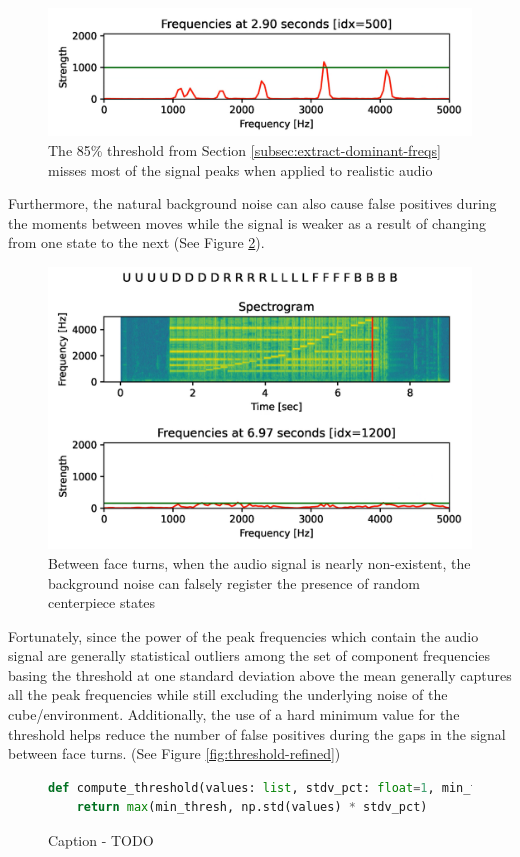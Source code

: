 \begin{figure}[h]
    \centering
    \includegraphics[width=0.8\linewidth]{Figures/5 Algorithm Design/threshold-miss.png}
    \caption{The 85\% threshold from Section \ref{subsec:extract-dominant-freqs} misses most of the signal peaks when applied to realistic audio}
    \label{fig:threshold-miss}
\end{figure}

Furthermore, the natural background noise can also cause false positives during the moments between moves while the signal is weaker as a result of changing from one state to the next (See Figure \ref{fig:threshold-false-positives}).

\begin{figure}[h]
    \centering
    \includegraphics[width=0.8\linewidth]{Figures/5 Algorithm Design/threshold-false-positives.png}
    \caption{Between face turns, when the audio signal is nearly non-existent, the background noise can falsely register the presence of random centerpiece states}
    \label{fig:threshold-false-positives}
\end{figure}

Fortunately, since the power of the peak frequencies which contain the audio signal are generally statistical outliers among the set of component frequencies basing the threshold at one standard deviation above the mean generally captures all the peak frequencies while still excluding the underlying noise of the cube/environment. Additionally, the use of a hard minimum value for the threshold helps reduce the number of false positives during the gaps in the signal between face turns. (See Figure \ref{fig:threshold-refined})
\begin{figure}[h]
\begin{lstlisting}[language=Python]
def compute_threshold(values: list, stdv_pct: float=1, min_thresh: int=50):
    return max(min_thresh, np.std(values) * stdv_pct)
\end{lstlisting}
\caption{Caption - TODO}
\label{fig:todo}
\end{figure}

